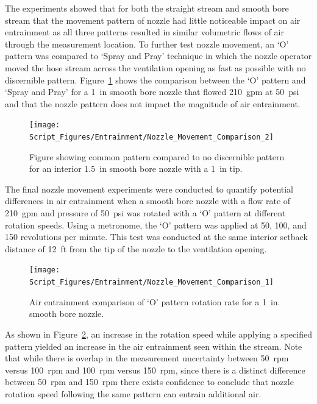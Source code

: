 \documentclass[12pt,oneside]{book}
\begin{document}
The experiments showed that for both the straight stream and smooth bore stream that the movement pattern of nozzle had little noticeable impact on air entrainment as all three patterns resulted in similar volumetric flows of air through the measurement location. To further test nozzle movement, an `O' pattern was compared to `Spray and Pray' technique in which the nozzle operator moved the hose stream across the ventilation opening as fast as possible with no discernible pattern. Figure~\ref{fig:Nozzle_Movement_PatterntoNoPattern_Comparison} shows the comparison between the `O' pattern and `Spray and Pray' for a 1~in smooth bore nozzle that flowed 210~gpm at 50~psi and that the nozzle pattern does not impact the magnitude of air entrainment. 

\begin{figure}[!ht]
\centering
\texttt{[image: Script\_Figures/Entrainment/Nozzle\_Movement\_Comparison\_2]}
\caption[Air Entrainment Comparison of `O' Pattern Versus `Spray and Pray']{Figure showing common pattern compared to no discernible pattern for an interior 1.5~in smooth bore nozzle with a 1~in tip.}
\label{fig:Nozzle_Movement_PatterntoNoPattern_Comparison}
\end{figure}

The final nozzle movement experiments were conducted to quantify potential differences in air entrainment when a smooth bore nozzle with a flow rate of 210~gpm and pressure of 50~psi was rotated with a `O' pattern at different rotation speeds. Using a metronome, the `O' pattern was applied at 50, 100, and 150 revolutions per minute. This test was conducted at the same interior setback distance of 12~ft from the tip of the nozzle to the ventilation opening.

\begin{figure}[!ht]
\centering
\texttt{[image: Script\_Figures/Entrainment/Nozzle\_Movement\_Comparison\_1]}
\caption[Air Entrainment Comparison of Pattern Rotation Rate]{Air entrainment comparison of `O' pattern rotation rate for a 1~in. smooth bore nozzle.}
\label{fig:Nozzle_Movement_RotationSpeed_Comparison}
\end{figure}

As shown in Figure~\ref{fig:Nozzle_Movement_RotationSpeed_Comparison}, an increase in the rotation speed while applying a specified pattern yielded an increase in the air entrainment seen within the stream. Note that while there is overlap in the measurement uncertainty between 50~rpm versus 100~rpm and 100~rpm versus 150~rpm, since there is a distinct difference between 50~rpm and 150~rpm there exists confidence to conclude that nozzle rotation speed following the same pattern can entrain additional air.
\end{document}
